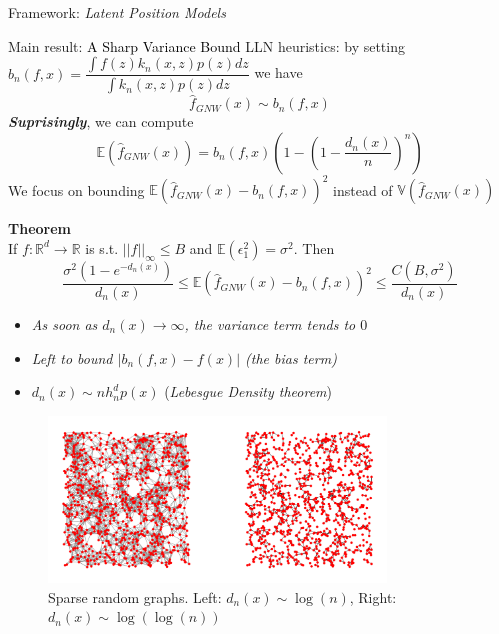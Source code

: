 \documentclass[final,dvipsnames]{beamer}
\makeatletter
\newcommand{\myemphBLACK}[1]{\textcolor{black}{#1}}
\newcommand{\mycolbackwhite}[1]{
\hspace*{.01\linewidth}\begin{minipage}{.96\linewidth}
\begin{mdframed}[backgroundcolor=white!10,linewidth=3pt]
\vspace{10pt}
#1
\vspace{10pt}
\end{mdframed}
\end{minipage}
}
\newcommand*{\rom}[1]{\expandafter\@slowromancap\romannumeral #1@}
\makeatother
\begin{document}
\begin{frame}
\begin{columns}[T]
\begin{column}{0.49\textwidth}
\begin{block}{Framework: \textit{Latent Position Models} \hspace*{\fill}{\large{\rom{1}}\qquad}}
\end{block}
\begin{block}{Main result: \myemphBLACK{A Sharp Variance Bound} \hspace*{\fill}{\large{\rom{3}}\qquad}}
LLN heuristics: by setting $b_n(f,x)=\dfrac{\int f(z)k_n(x,z)p(z)dz}{\int k_n(x,z)p(z)dz}$ we have 
\begin{equation*}
    \hat{f}_{GNW}(x)\sim b_n(f,x)
\end{equation*}
\vspace{10pt}
\textit{\textbf{Suprisingly}}, we can compute
\begin{equation*}
    \mathbb{E}(\hat{f}_{GNW}(x))=b_n(f,x)(1-(1-\frac{d_n(x)}{n})^n)
\end{equation*}
We focus on bounding $\mathbb{E}(\hat{f}_{GNW}(x)-b_n(f,x))^2$ instead of $\mathbb{V}(\hat{f}_{GNW}(x))$
\vspace{10pt}
\mycolbackwhite{\textbf{Theorem}
    \vspace{10pt}
    \\
    If $f\colon\mathbb{R}^d\to\mathbb{R}$ is s.t. $||f||_{\infty}\leq B$ and $\mathbb{E}(\epsilon_1^2)=\sigma^2$. 
    Then
    \begin{equation*}
        \frac{\sigma^2(1-e^{-d_n(x)})}{d_n(x)}\leq \mathbb{E}(\hat{f}_{GNW}(x)-b_n(f,x))^2\leq \frac{C(B,\sigma^2)}{d_n(x)}
    \end{equation*}
    }
    \vspace{20pt}
    \begin{itemize}
        \item \textit{As soon as $d_n(x)\to\infty$, the \textit{variance term} tends to $0$} 
        \item \textit{Left to bound $|b_n(f,x)-f(x)|$ (the \textit{bias} term)} %
        \item  $d_n(x)\sim nh_n^dp(x)$ (\textit{Lebesgue Density theorem})
    \end{itemize}
    \begin{figure}
        \centering
        \includegraphics[width=0.8\textwidth]{fresh_for_marseille.png}
        \caption{Sparse random graphs. Left: $d_n(x)\sim\log(n)$, Right: $d_n(x)\sim\log(\log(n))$}
    \end{figure}
\end{block}


\end{column}
\end{columns}
\end{frame}
\end{document}
